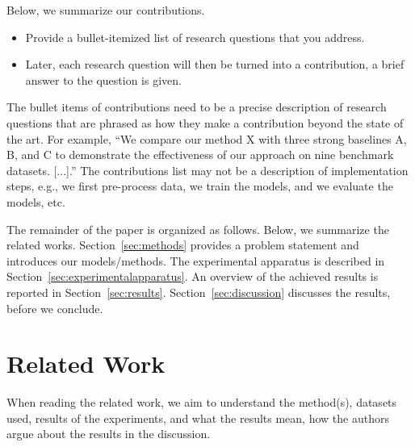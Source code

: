 \documentclass[sigconf, review, nonacm]{acmart}
\begin{document}
Below, we summarize our contributions.
\begin{itemize}
    \item Provide a bullet-itemized list of research questions that you address. 
    \item Later, each research question will then be turned into a contribution, \ie a brief answer to the question is given. 
\end{itemize}

\begin{tcolorbox}[title=Introduction What is a contribution item and what not.]
The bullet items of contributions need to be a precise description of research questions that are phrased as how they make a contribution beyond the state of the art. 
For example, ``We compare our method X with three strong baselines A, B, and C to demonstrate the effectiveness of our approach on nine benchmark datasets. [...].'' 
The contributions list may not be a description of implementation steps, e.g., we first pre-process data, we train the models, and we evaluate the models, etc. 


\end{tcolorbox}


The remainder of the paper is organized as follows.
%
Below, we summarize the related works.
Section~\ref{sec:methods} provides a problem statement and introduces our models/methods.
The experimental apparatus is described in Section~\ref{sec:experimentalapparatus}.
An overview of the achieved results is reported in Section~\ref{sec:results}. 
Section~\ref{sec:discussion} discusses the results, before we conclude.



\section{Related Work}
\label{sec:relatedwork}

When reading the related work, we aim to understand the method(s), datasets used, results of the experiments, and what the results mean, \ie how the authors argue about the results in the discussion.
\end{document}
